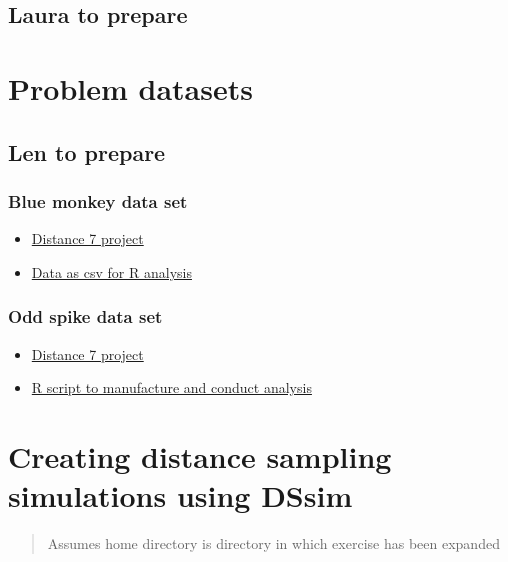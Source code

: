 \documentclass[]{book}
\providecommand{\tightlist}{%
  \setlength{\itemsep}{0pt}\setlength{\parskip}{0pt}}
\theoremstyle{definition}
\theoremstyle{definition}
\theoremstyle{remark}
\begin{document}
\section{Laura to prepare}\label{laura-to-prepare}

\chapter{Problem datasets}\label{problem-datasets}

\section{Len to prepare}\label{len-to-prepare}

\subsection{Blue monkey data set}\label{blue-monkey-data-set}

\begin{itemize}
\tightlist
\item
  \href{Difficult\%20data/D7BlueMonkey\%20-\%20Demo\%203.zip}{Distance 7
  project}
\item
  \href{Difficult\%20data/BlueMonkey.csv}{Data as csv for R analysis}
\end{itemize}

\subsection{Odd spike data set}\label{odd-spike-data-set}

\begin{itemize}
\tightlist
\item
  \href{Difficult\%20data/D7OddSpike\%20-\%20Demo\%202.zip}{Distance 7
  project}
\item
  \href{Difficult\%20data/Oddspike.r}{R script to manufacture and
  conduct analysis}
\end{itemize}

\chapter{Creating distance sampling simulations using
DSsim}\label{creating-distance-sampling-simulations-using-dssim}

\begin{quote}
Assumes home directory is directory in which exercise has been expanded
\end{quote}
\end{document}
